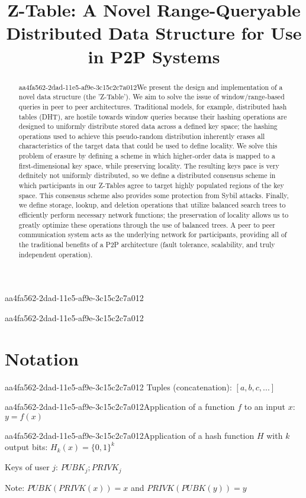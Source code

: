 \documentclass[12pt]{article}
\title{Z-Table: A Novel Range-Queryable Distributed Data Structure for Use in P2P Systems}
\begin{document}
aa4fa562-2dad-11e5-af9e-3c15c2c7a012
\maketitle

\begin{abstract}
aa4fa562-2dad-11e5-af9e-3c15c2c7a012We present the design and implementation of a novel data structure (the 'Z-Table'). We aim to solve the issue of window/range-based queries in peer to peer architectures. Traditional models, for example,  distributed hash tables (DHT), are hostile towards window queries because their hashing operations are designed to uniformly distribute stored data across a defined key space; the hashing operations used to achieve this pseudo-random distribution inherently erases all characteristics of the target data that could be used to define locality. We solve this problem of erasure by defining a scheme in which higher-order data is mapped to a first-dimensional key space, while preserving locality. The resulting keys pace is very definitely not uniformly distributed, so we define a distributed consensus scheme in which participants in our Z-Tables agree to target highly populated regions of the key space. This consensus scheme also provides some protection from Sybil attacks. Finally, we define storage, lookup, and deletion operations that utilize balanced search trees to efficiently perform necessary network functions; the preservation of locality allows us to greatly optimize these operations through the use of balanced trees. A peer to peer communication system acts as the underlying network for participants, providing all of the traditional benefits of a P2P architecture (fault tolerance, scalability, and truly independent operation).
\end{abstract}

aa4fa562-2dad-11e5-af9e-3c15c2c7a012\section{Notation}
aa4fa562-2dad-11e5-af9e-3c15c2c7a012
Tuples (concatenation): $[a,b,c,...]$

aa4fa562-2dad-11e5-af9e-3c15c2c7a012Application of a function $f$ to an input $x$: $y=f(x)$

aa4fa562-2dad-11e5-af9e-3c15c2c7a012Application of a hash function $H$ with $k$ output bits: $H_{k}(x) = \{0,1\}^k$

Keys of user $j$: $ PUBK_j; PRIVK_j $

Note: $PUBK(PRIVK(x)) = x$ and $PRIVK(PUBK(y)) = y$~
\end{document}
